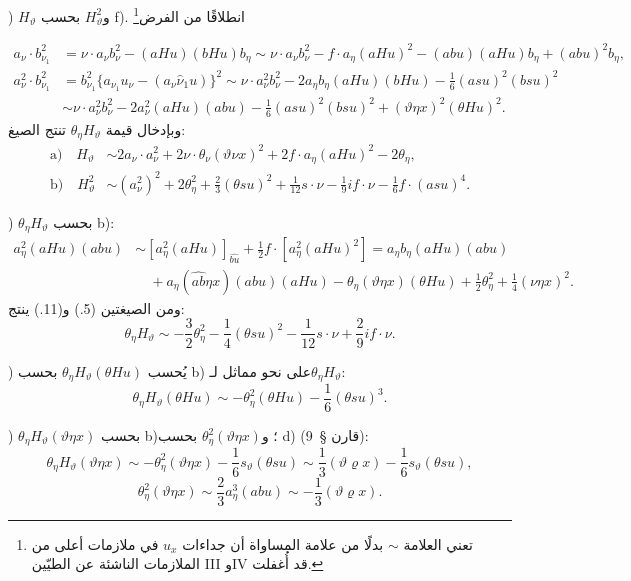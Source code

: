 \documentclass[11pt]{article}
\providecommand{\R}{\varrho}
\newcommand{\srcLTR}[1]{\relax\ifmmode\text{\mbox{\babelsublr{\foreignlanguage{english}{#1}}}}\else\babelsublr{\foreignlanguage{english}{#1}}\fi}
\newcommand{\srcfn}[2]{\begingroup\renewcommand{\thefootnote}{\srcLTR{#1}}\footnote{#2}\addtocounter{footnote}{-1}\endgroup}
\begin{document}
) $H_\vartheta$ و$H_\vartheta^2$ بحسب f). انطلاقًا من الفرض\srcfn{*)}{تعني العلامة $\sim$ بدلًا من علامة المساواة أن جداءات $u_x$ في ملازمات أعلى من الملازمات الناشئة عن الطيّين III وIV قد أُغفلت.}
\[
\begin{aligned}
a_\nu\cdot b_{\nu_1}^2
&=\nu\cdot a_\nu b_\nu^2-(aHu)(bHu)b_\eta
\sim \nu\cdot a_\nu b_\nu^2-f\cdot a_\eta(aHu)^2-(abu)(aHu)b_\eta+(abu)^2b_\eta,\\
a_\nu^2\cdot b_{\nu_1}^2
&=b_{\nu_1}^2\{a_{\nu_1}u_\nu-(a_\nu\widehat{\nu}_1u)\}^2
\sim \nu\cdot a_\nu^2b_\nu^2-2a_\eta b_\eta(aHu)(bHu)-\frac16(asu)^2(bsu)^2\\
&\sim \nu\cdot a_\nu^2b_\nu^2-2a_\nu^2(aHu)(abu)-\frac16(asu)^2(bsu)^2+(\vartheta\eta x)^2(\theta Hu)^2.
\end{aligned}
\]
وبإدخال قيمة $\theta_\eta H_\vartheta$ تنتج الصيغ:
\[
\tag{12}
\begin{aligned}
\text{a)}\quad H_\vartheta&\sim 2a_\nu\cdot a_\nu^2+2\nu\cdot\theta_\nu(\vartheta\nu x)^2+2f\cdot a_\eta(aHu)^2-2\theta_\eta,\\
\text{b)}\quad H_\vartheta^2&\sim (a_\nu^2)^2+2\theta_\eta^2+\frac23(\theta su)^2+\frac1{12}s\cdot\nu-\frac19 i f\cdot\nu-\frac16f\cdot(asu)^4.
\end{aligned}
\]

) $\theta_\eta H_\vartheta$ بحسب b):
\[
\begin{aligned}
a_\eta^2(aHu)(abu)
&\sim [a_\eta^2(aHu)]_{\widehat{bu}}+\frac12 f\cdot[a_\eta^2(aHu)^2]
=a_\eta b_\eta(aHu)(abu)\\
&\quad+a_\eta(\widehat{ab}\eta x)(abu)(aHu)-\theta_\eta(\vartheta\eta x)(\theta Hu)+\frac12\theta_\eta^2+\frac14(\nu\eta x)^2.
\end{aligned}
\]
ومن الصيغتين (5.) و(11.) ينتج:
\[
\theta_\eta H_\vartheta\sim-\frac32\theta_\eta^2-\frac14(\theta su)^2-\frac1{12}s\cdot\nu+\frac29 i f\cdot\nu.
\]

) يُحسب $\theta_\eta H_\vartheta(\theta Hu)$ بحسب b) على نحو مماثل لـ$\theta_\eta H_\vartheta$:
\[
\theta_\eta H_\vartheta(\theta Hu)\sim-\theta_\eta^2(\theta Hu)-\frac16(\theta su)^3.
\]

) $\theta_\eta H_\vartheta(\vartheta\eta x)$ بحسب b)؛ و$\theta_\eta^2(\vartheta\eta x)$ بحسب d) (قارن \S\ 9):
\[
\theta_\eta H_\vartheta(\vartheta\eta x)\sim-\theta_\eta^2(\vartheta\eta x)-\frac16s_\vartheta(\theta su)
\sim\frac13(\vartheta\R x)-\frac16s_\vartheta(\theta su),
\]
\[
\theta_\eta^2(\vartheta\eta x)\sim\frac23a_\eta^3(abu)\sim-\frac13(\vartheta\R x).
\]
\end{document}
